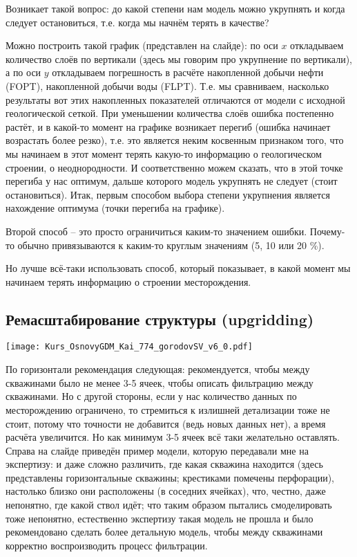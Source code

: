 \documentclass[main.tex]{subfiles}
\begin{document}
Возникает такой вопрос: до какой степени нам модель можно укрупнять и когда следует остановиться, т.е. когда мы начнём терять в качестве?

Можно построить такой график (представлен на слайде): по оси $x$ откладываем количество слоёв по вертикали (здесь мы говорим про укрупнение по вертикали), а по оси $y$ откладываем погрешность в расчёте накопленной добычи нефти (FOPT), накопленной добычи воды (FLPT).
Т.е. мы сравниваем, насколько результаты вот этих накопленных показателей отличаются от модели с исходной геологической сеткой.
При уменьшении количества слоёв ошибка постепенно растёт, и в какой-то момент на графике возникает перегиб (ошибка начинает возрастать более резко), т.е. это является неким косвенным признаком того, что мы начинаем в этот момент терять какую-то информацию о геологическом строении, о неоднородности.
И соответственно можем сказать, что в этой точке перегиба у нас оптимум, дальше которого модель укрупнять не следует (стоит остановиться).
Итак, первым способом выбора степени укрупнения является нахождение оптимума (точки перегиба на графике).

Второй способ -- это просто ограничиться каким-то значением ошибки. Почему-то обычно привязываются к каким-то круглым значениям (5, 10 или 20 \%).

Но лучше всё-таки использовать способ, который показывает, в какой момент мы начинаем терять информацию о строении месторождения.

\subsection{Ремасштабирование структуры (upgridding)}

\texttt{[image: Kurs\_OsnovyGDM\_Kai\_774\_gorodovSV\_v6\_0.pdf]}

По горизонтали рекомендация следующая: рекомендуется, чтобы между скважинами было не менее 3-5 ячеек, чтобы описать фильтрацию между скважинами.
Но с другой стороны, если у нас количество данных по месторождению ограничено, то стремиться к излишней детализации тоже не стоит, потому что точности не добавится (ведь новых данных нет), а время расчёта увеличится.
Но как минимум 3-5 ячеек всё таки желательно оставлять.
Справа на слайде приведён пример модели, которую передавали мне на экспертизу: и даже сложно различить, где какая скважина находится (здесь представлены горизонтальные скважины; крестиками помечены перфорации), настолько близко они расположены (в соседних ячейках), что, честно, даже непонятно, где какой ствол идёт; что таким образом пытались смоделировать тоже непонятно, естественно экспертизу такая модель не прошла и было рекомендовано сделать более детальную модель, чтобы между скважинами корректно воспроизводить процесс фильтрации.
\end{document}
